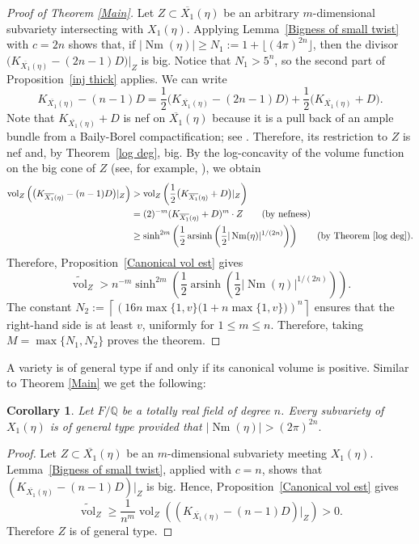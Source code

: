 \documentclass[12 pt]{amsart}
\newtheorem{Corollary}[theorem]{Corollary}
\theoremstyle{definition}
\newcommand{\Xb}{\overline{X_{1}}}
\newcommand{\Nm}{\operatorname{Nm}}
\begin{document}
\begin{proof}[Proof of Theorem \ref{Main}]
Let $Z\subset\Xb(\eta)$ be an arbitrary $m$-dimensional subvariety
intersecting with $X_1(\eta)$. Applying Lemma~\ref{Bigness of small twist} with
$c=2n$ shows that, if
$|\Nm(\eta)|\ge N_1:=1+\lfloor(4\pi)^{2n}\rfloor$, then
the divisor \(
\bigl(K_{\Xb(\eta)}-(2n-1)D\bigr)|_Z
\)
is big. Notice that \(N_1>5^n\), so the second part of Proposition~\ref{inj thick} applies. We can write
\[
K_{\Xb(\eta)}-(n-1)D
=
\frac12\bigl(K_{\Xb(\eta)}-(2n-1)D\bigr)
+
\frac12\bigl(K_{\Xb(\eta)}+D\bigr).
\]
Note that $K_{\Xb(\eta)}+D$ is nef on $\Xb(\eta)$ because it is a pull back of an ample bundle from a Baily-Borel compactification; see \cite[Proposition 3.4.b]{mumford1977hirzebruch}. 
Therefore, its restriction to
$Z$ is nef and, by
Theorem~\ref{log deg}, big. By the log-concavity of the volume function
on the big cone of $Z$ (see, for example,
\cite[Theorem~11.4.9]{Lazarsfeld2}), we obtain
\begin{align*}
\operatorname{vol}_Z\left(
\bigl(K_{\Xb(\eta)}-(n-1)D\bigr)|_Z
\right)
&>
\operatorname{vol}_Z\left(
\frac12\bigl(K_{\Xb(\eta)}+D\bigr)|_Z
\right)\\
&=
(2)^{-m}(K_{\Xb(\eta)}+D)^m\cdot Z
\qquad\text{(by nefness)}\\
&\ge
\sinh^{2m}\left(
\frac12\operatorname{arsinh}\left(
\frac12|\Nm(\eta)|^{1/(2n)}
\right)\right)
\qquad\text{(by Theorem~\ref{log deg})}.
\end{align*}
Therefore, Proposition~\ref{Canonical vol est} gives
\[
\widetilde{\operatorname{vol}}_Z
>
n^{-m}
\sinh^{2m}\left(
\frac12\operatorname{arsinh}\left(
\frac12|\Nm(\eta)|^{1/(2n)}
\right)\right).
\]
The constant
\(
N_2:=
\left\lceil
\left(16n\max\{1,v\}
\bigl(1+n\max\{1,v\}\bigr)\right)^n
\right\rceil
\)
ensures that the right-hand side is at least $v$, uniformly for
$1\le m\le n$. Therefore, taking $M=\max\{N_1,N_2\}$ proves the theorem.
\end{proof}



A variety is of general type if and only if its canonical volume is positive. Similar to Theorem \ref{Main} we get the following:  

\begin{Corollary}\label{general type}
Let $F/\mathbb Q$ be a totally real field of degree $n$. 
Every subvariety of $X_1(\eta)$
is of general type provided that 
\(
|\Nm(\eta)|>(2\pi)^{2n}.
\)
\end{Corollary}

\begin{proof}Let $Z\subset\Xb(\eta)$ be an $m$-dimensional subvariety meeting $X_1(\eta)$. Lemma~\ref{Bigness of small twist}, applied with $c=n$, shows that $(K_{\Xb(\eta)}-(n-1)D)|_Z$ is big. Hence, Proposition~\ref{Canonical vol est} gives\[\widetilde{\operatorname{vol}}_Z\ge \frac1{n^m}\operatorname{vol}_Z\left((K_{\Xb(\eta)}-(n-1)D)|_Z\right)>0.\] Therefore $Z$ is of general type.
\end{proof}
\end{document}
